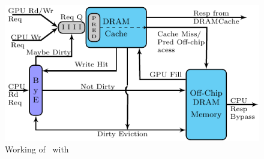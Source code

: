 \begin{figure}[htb]
	\centering
   	\includegraphics[scale=1.5]{figures/bloom}	
	\caption{Working of \cachename\ with \bypassname}
	\label{fig:bye}
\end{figure}

